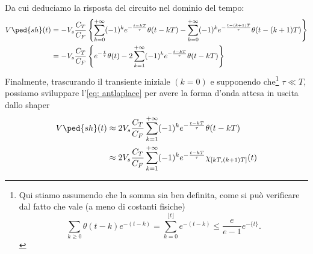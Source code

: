 \documentclass[10pt, a4paper, italian]{article}
\begin{document}
Da cui deduciamo la risposta del circuito nel dominio del tempo:
\begin{align}
V\ped{sh}(t) &= - V_s \frac{C_T}{C_F} \left\{ 
\sum_{k=0}^{+\infty} (-1)^k e^{-\frac{t - kT}{\tau}}\theta(t - kT) - 
\sum_{k=0}^{+\infty} (-1)^k e^{-\frac{t - (k+1) T}{\tau}} \theta(t - (k+1)T)
\right\} \\
&= - V_s \frac{C_T}{C_F} \left\{ e^{-\frac{t}{\tau}} \theta(t) -
2 \sum_{k=1}^{+\infty} (-1)^k e^{-\frac{t - kT}{\tau}}
\theta(t -  kT) \right\}
\label{eq: antlaplace}
\end{align}
Finalmente, trascurando il transiente iniziale $(k = 0)$ e supponendo
che\footnote{Qui stiamo assumendo che la somma sia ben definita, come si può
verificare dal fatto che vale (a meno di costanti fisiche)
\[
\sum_{k \geq 0} \theta(t-k) e^{-(t-k)} =
\sum_{k=0}^{\lfloor t \rfloor} e^{-(t-k)} \leq \frac{e}{e-1} e^{-\{t\}}.
\]}
$\tau \ll T$, possiamo sviluppare l'\cref{eq: antlaplace} per avere la forma 
d'onda attesa in uscita dallo shaper
\begin{align}\label{eq: Vshaper}
V\ped{sh}(t) &\approx 2 V_s \frac{C_T}{C_F} \sum_{k=1}^{+\infty} 
(-1)^{k} e^{-\frac{t - kT}{\tau}} \theta(t - kT) \nonumber\\
&\approx  2 V_s \frac{C_T}{C_F} \sum_{k=1}^{+\infty} 
(-1)^{k} e^{-\frac{t - kT}{\tau}} \chi_{[kT, (k+1)T]}(t)
\end{align}
\end{document}
